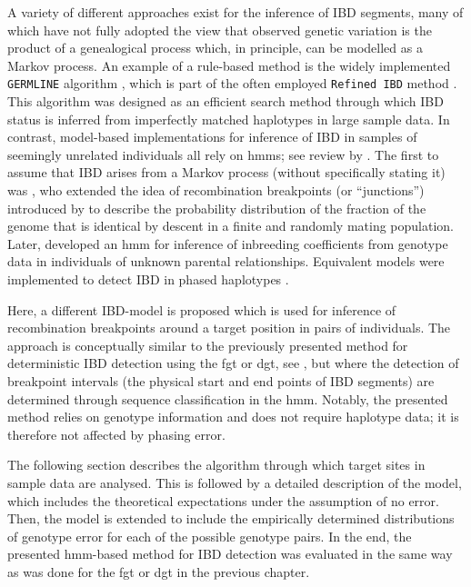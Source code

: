 A variety of different approaches exist for the inference of IBD segments, many of which have not fully adopted the view that observed genetic variation is the product of a genealogical process which, in principle, can be modelled as a Markov process.
An example of a rule-based method is the widely implemented \texttt{GERMLINE} algorithm \citep{Gusev:2009hd}, which is part of the often employed \texttt{Refined\,IBD} method \citep{Browning:2013eh}.
This algorithm was designed as an efficient search method through which IBD status is inferred from imperfectly matched haplotypes in large sample data.
In contrast, model-based implementations for inference of IBD in samples of seemingly unrelated individuals all rely on \glspl{hmm}; see review by \citet{Thompson:2013cj}.
The first to assume that IBD arises from a Markov process (without specifically stating it) was \citet{Stam:1980gs}, who extended the idea of recombination breakpoints (or ``junctions'') introduced by \citet{Fisher:1949vh,fisher1954} to describe the probability distribution of the fraction of the genome that is identical by descent in a finite and randomly mating population.
Later, \citet{Leutenegger:2003is} developed an \gls{hmm} for inference of inbreeding coefficients from genotype data in individuals of unknown parental relationships.
Equivalent models were implemented to detect IBD in phased haplotypes \citep[\eg][]{Purcell:2007dg,Browning:2008es}.

Here, a different IBD-model is proposed which is used for inference of recombination breakpoints around a target position in pairs of individuals.
The approach is conceptually similar to the previously presented method for deterministic IBD detection using the \gls{fgt} or \gls{dgt}, see , but where the detection of breakpoint intervals (\ie the physical start and end points of IBD segments) are determined through sequence classification in the \gls{hmm}.
Notably, the presented method relies on genotype information and does not require haplotype data; it is therefore not affected by phasing error.

The following section describes the algorithm through which target sites in sample data are analysed.
This is followed by a detailed description of the model, which includes the theoretical expectations under the assumption of no error.
Then, the model is extended to include the empirically determined distributions of genotype error for each of the possible genotype pairs.
In the end, the presented \gls{hmm}-based method for IBD detection was evaluated in the same way as was done for the \gls{fgt} or \gls{dgt} in the previous chapter.


